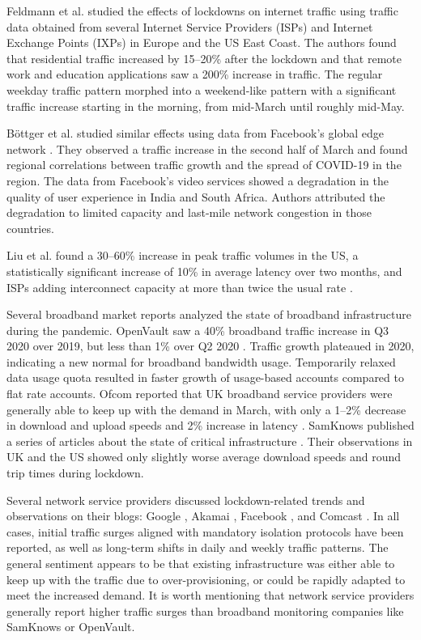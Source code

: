 \documentclass[conference,10pt]{IEEEtran}
\begin{document}
Feldmann et al. studied the effects of lockdowns on internet traffic using traffic data obtained from several Internet Service Providers (ISPs) and Internet Exchange Points (IXPs) in Europe and the US East Coast\cite{feldmann2020lockdown}. The authors found that residential traffic increased by 15--20\% after the lockdown and that remote work and education applications saw a 200\% increase in traffic. The regular weekday traffic pattern morphed into a weekend-like pattern with a significant traffic increase starting in the morning, from mid-March until roughly mid-May.

B\"{o}ttger et al. studied similar effects using data from Facebook's global edge network \cite{bottger2020internet}. They observed a traffic increase in the second half of March and found regional correlations between traffic growth and the spread of COVID-19 in the region. The data from Facebook's video services showed a degradation in the quality of user experience in India and South Africa. Authors attributed the degradation to limited capacity and last-mile network congestion in those countries.

Liu et al. found a 30--60\% increase in peak traffic volumes in the US, a statistically significant increase of 10\% in average latency over two months, and ISPs adding interconnect capacity at more than twice the usual rate \cite{liu2020characterizing}.

Several broadband market reports analyzed the state of broadband infrastructure during the pandemic. OpenVault saw a 40\% broadband traffic increase in Q3 2020 over 2019, but less than 1\% over Q2 2020 \cite{openvault}. Traffic growth plateaued in 2020, indicating a new normal for broadband bandwidth usage. Temporarily relaxed data usage quota resulted in faster growth of usage-based accounts compared to flat rate accounts. Ofcom reported that UK broadband service providers were generally able to keep up with the demand in March, with only a 1--2\% decrease in download and upload speeds and 2\% increase in latency \cite{uk-home-broadband-performance}. SamKnows published a series of articles about the state of critical infrastructure \cite{samknows-cdn,samknows-video-streaming,samknows-video-conferencing,samknows-usa}. Their observations in UK and the US showed only slightly worse average download speeds and round trip times during lockdown.

Several network service providers discussed lockdown-related trends and observations on their blogs: Google \cite{google}, Akamai \cite{akamai}, Facebook \cite{facebook}, and Comcast \cite{comcast}. In all cases, initial traffic surges aligned with mandatory isolation protocols have been reported, as well as long-term shifts in daily and weekly traffic patterns. The general sentiment appears to be that existing infrastructure was either able to keep up with the traffic due to over-provisioning, or could be rapidly adapted to meet the increased demand. It is worth mentioning that network service providers generally report higher traffic surges than broadband monitoring companies like SamKnows or OpenVault.
\end{document}
